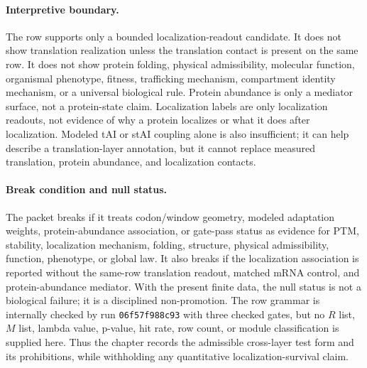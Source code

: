 \paragraph{Interpretive boundary.}
The row supports only a bounded localization-readout candidate.  It does not show translation realization unless the translation contact is present on the same row.  It does not show protein folding, physical admissibility, molecular function, organismal phenotype, fitness, trafficking mechanism, compartment identity mechanism, or a universal biological rule.  Protein abundance is only a mediator surface, not a protein-state claim.  Localization labels are only localization readouts, not evidence of why a protein localizes or what it does after localization.  Modeled tAI or stAI coupling alone is also insufficient; it can help describe a translation-layer annotation, but it cannot replace measured translation, protein abundance, and localization contacts.

\paragraph{Break condition and null status.}
The packet breaks if it treats codon/window geometry, modeled adaptation weights, protein-abundance association, or gate-pass status as evidence for PTM, stability, localization mechanism, folding, structure, physical admissibility, function, phenotype, or global law.  It also breaks if the localization association is reported without the same-row translation readout, matched mRNA control, and protein-abundance mediator.  With the present finite data, the null status is not a biological failure; it is a disciplined non-promotion.  The row grammar is internally checked by run \texttt{06f57f988c93} with three checked gates, but no $R$ list, $M$ list, lambda value, p-value, hit rate, row count, or module classification is supplied here.  Thus the chapter records the admissible cross-layer test form and its prohibitions, while withholding any quantitative localization-survival claim.
